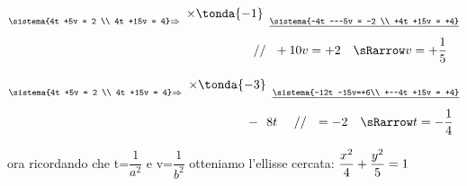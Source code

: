 \begin{esempio}
\[\stackrel{\sistema{4t +5v = 2 \\ 4t +15v = 4}\Rightarrow
  \begin{array}{l}\times \tonda{-1}\\ ~ \end{array}
  \underline{\sistema{-4t -~~5v = -2 \\ +4t +15v = +4}}}
  {\hspace{66mm}
    // ~~ +10v  =+2 \quad \sRarrow v=+\frac{1}{5}}\]


\[\stackrel{\sistema{4t +5v = 2 \\  4t +15v = 4}\Rightarrow
  \begin{array}{l}\times \tonda{-3}\\ ~ \end{array}
  \underline{\sistema{-12t -15v=+6\\ +~~4t +15v = +4}}}
  {\hspace{65.5mm}
   -~~8t ~~~~ // ~~  =-2 \quad \sRarrow t=-\frac{1}{4}}\]


\vspace{6pt}
ora ricordando che t=\(\dfrac{1}{a^{2}}\) e v=\(\dfrac{1}{b^{2}}\)
otteniamo l'ellisse cercata: 
\( \vspace{2cm} \dfrac{x^{2}}{4} + \dfrac{y^{2}}{5} = 1\)
\end{esempio}


